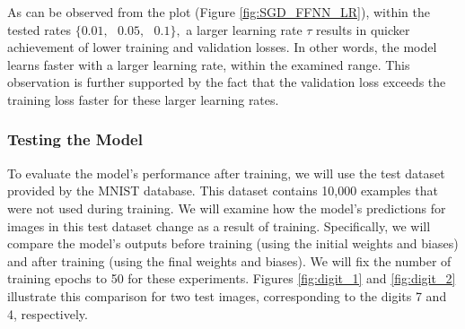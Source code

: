 As can be observed from the plot (Figure \ref{fig:SGD_FFNN_LR}), within the tested rates $\{0.01,\text{ }0.05,\text{ }0.1\},$ a larger learning rate $\tau$ results in quicker achievement of lower training and validation losses. In other words, the model learns faster with a larger learning rate, within the examined range. This observation is further supported by the fact that the validation loss exceeds the training loss faster for these larger learning rates. 
\subsubsection{Testing the Model}
To evaluate the model's performance after training, we will use the test dataset provided by the MNIST database. This dataset contains 10,000 examples that were not used during training. We will examine how the model's predictions for images in this test dataset change as a result of training. Specifically, we will compare the model's outputs before training (using the initial weights and biases) and after training (using the final weights and biases). We will fix the number of training epochs to 50 for these experiments. Figures \ref{fig:digit_1} and \ref{fig:digit_2} illustrate this comparison for two test images, corresponding to the digits 7 and 4, respectively.

